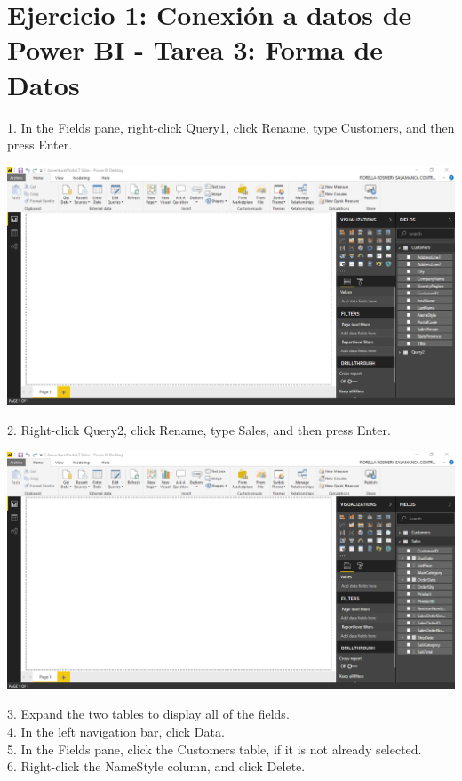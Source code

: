 \section{Ejercicio 1: Conexión a datos de Power BI - Tarea 3: Forma de Datos} 

1. In the Fields pane, right-click Query1, click Rename, type Customers, and then press Enter.\\

	\begin{center}
	\includegraphics[width=17cm]{./Imagenes/Ejercicio1/Tarea3/1}
	\end{center}	

2. Right-click Query2, click Rename, type Sales, and then press Enter.\\

	\begin{center}
	\includegraphics[width=17cm]{./Imagenes/Ejercicio1/Tarea3/2}
	\end{center}	

3. Expand the two tables to display all of the fields.\\
4. In the left navigation bar, click Data.\\
5. In the Fields pane, click the Customers table, if it is not already selected.\\
6. Right-click the NameStyle column, and click Delete.\\

